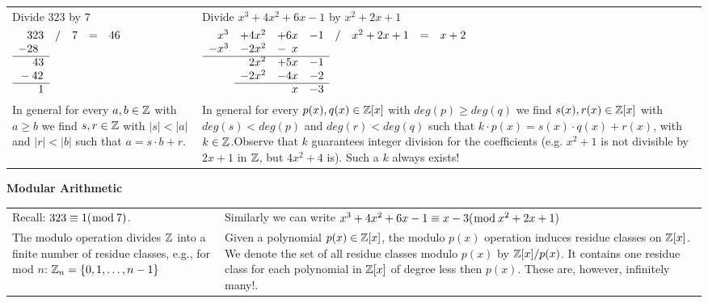 \begin{tabular}{p{}|p{}}
  Divide $323$ by $7$ & Divide $x^3+4x^2+6x-1$ by $x^2+2x+1$\\
  $\begin{array}{lcccc}
      \phantom{-}323 & / & 7 & = & 46\\
      -28 & & & & \\\cline{1-1}
      \phantom{-3}43 & & & & \\
      \phantom{}-42 & & & & \\\cline{1-1}
      \phantom{-34}1 & & & & \\
    \end{array}$
  &\arraycolsep1pt
  $\begin{array}{llllllcccc}
    \phantom{-}x^3 & +4x^2 & +6x & -1 & / & x^2+2x+1 & = & x + 2 \\
    -x^3 & - 2x^2 & -\phantom{6}x \\\cline{1-4}
    & \phantom{-}2x^2 & +5x & -1\\
    & - 2x^2 & -4x & -2\\\cline{2-4}
    & & \phantom{-4}x & -3
  \end{array}$\\[.4cm]
  In general for every $a,b\in\Z$ with $a\geq b$ we find $s,r\in\Z$ 
  with $|s|<|a|$ and $|r|<|b|$ such that $a=s\cdot b + r$.
  & 
  In general for every $p(x),q(x)\in\Z[x]$ with $deg(p)\geq deg(q)$ we find $s(x),r(x)\in\Z[x]$ 
  with $deg(s)<deg(p)$ and $deg(r)<deg(q)$ such that $k\cdot p(x)=s(x)\cdot q(x) + r(x)$, with 
  $k\in\Z$.\newline Observe that $k$ guarantees integer division
  for the coefficients (e.g. $x^2+1$ is not divisible by $2x+1$ in $\Z$, but $4x^2+4$ is). 
  Such a $k$ always exists!
\end{tabular}

\vspace{.4cm}\textbf{Modular Arithmetic}\vspace{.1cm}

\begin{tabular}{p{}|p{}}
  Recall: $\modulo{323}{7}{1}$. & 
  Similarly we can write $\modulo{x^3+4x^2+6x-1}{x^2+2x+1}{x-3}$\\[.2cm]
  The modulo operation divides $\Z$ into a finite number of residue classes, e.g., for mod $n$:
  $\Z_n=\set{0,1,\ldots,n-1}$ &
  Given a polynomial $p(x)\in\Z[x]$, the modulo $p(x)$ operation induces residue classes on $\Z[x]$. 
  We denote the set of all residue classes modulo $p(x)$ by $\Z[x]/p(x)$. It contains one 
  residue class for each polynomial in $\Z[x]$ of degree less then $p(x)$.   These are, however,
  infinitely many!.
\end{tabular}

